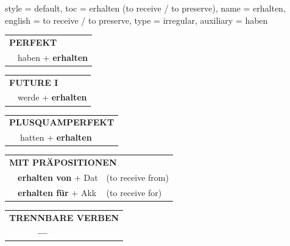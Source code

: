\begin{verbentry}{
  style = {default},
  toc = {erhalten (to receive / to preserve)},
  name = {erhalten},
  english = {to receive / to preserve},
  type = {irregular},
  auxiliary = {haben}
}
 \begin{tabular}{rl}
     \multicolumn{2}{l}{\textbf{PERFEKT}}\\
   & haben + \textbf{erhalten}\\
  \end{tabular}
\hfill
   \begin{tabular}{rl}
    \multicolumn{2}{l}{\textbf{FUTURE I} }\\
   & werde + \textbf{erhalten}\\
  \end{tabular}
\hfill
   \begin{tabular}{rl}
      \multicolumn{2}{l}{\textbf{PLUSQUAMPERFEKT}}\\
   & hatten + \textbf{erhalten}\\
  \end{tabular}

   \vspace{10pt}

   \begin{tabular}{lll}
      \multicolumn{3}{l}{\textbf{MIT PRÄPOSITIONEN}}\\
& \textbf{erhalten von} + Dat & (to receive from)\\
& \textbf{erhalten für} + Akk & (to receive for)\\
\end{tabular}
  \hfill
   \begin{tabular}{lll}
\multicolumn{3}{l}{\textbf{TRENNBARE VERBEN}}\\
& \textbf{---} & \\
\end{tabular}

  \vspace{-5pt}
\end{verbentry}

